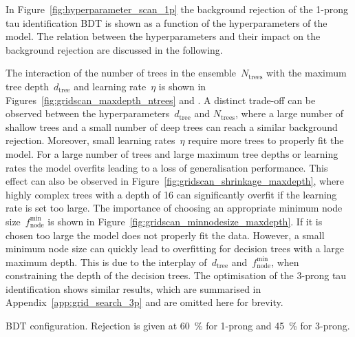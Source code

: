 In Figure~\ref{fig:hyperparameter_scan_1p} the background rejection of the
1-prong tau identification BDT is shown as a function of the hyperparameters of
the model. The relation between the hyperparameters and their impact on the
background rejection are discussed in the following.

The interaction of the number of trees in the ensemble~$N_\text{trees}$ with the
maximum tree depth~$d_\text{tree}$ and learning rate~$\eta$ is shown in
Figures~\ref{fig:gridscan_maxdepth_ntrees} and
. A distinct trade-off can be observed
between the hyperparameters~$d_\text{tree}$ and $N_\text{trees}$, where a large
number of shallow trees and a small number of deep trees can reach a similar
background rejection. Moreover, small learning rates~$\eta$ require more trees
to properly fit the model. For a large number of trees and large maximum tree
depths or learning rates the model overfits leading to a loss of generalisation
performance. This effect can also be observed in
Figure~\ref{fig:gridscan_shrinkage_maxdepth}, where highly complex trees with a
depth of 16 can significantly overfit if the learning rate is set too large. The
importance of choosing an appropriate minimum node
size~$f_\text{node}^\text{min}$ is shown in
Figure~\ref{fig:gridscan_minnodesize_maxdepth}. If it is chosen too large the
model does not properly fit the data. However, a small minimum node size can
quickly lead to overfitting for decision trees with a large maximum depth. This
is due to the interplay of~$d_\text{tree}$ and~$f_\text{node}^\text{min}$, when
constraining the depth of the decision trees. The optimisation of the 3-prong
tau identification shows similar results, which are summarised in
Appendix~\ref{app:grid_search_3p} and are omitted here for brevity.

\begin{table}[htb]
  \centering
  {\small}
  \caption{BDT configuration. Rejection is given at \SI{60}{\percent} for
    1-prong and \SI{45}{\percent} for 3-prong.}
  \label{tab:bdt_perfs}
\end{table}

